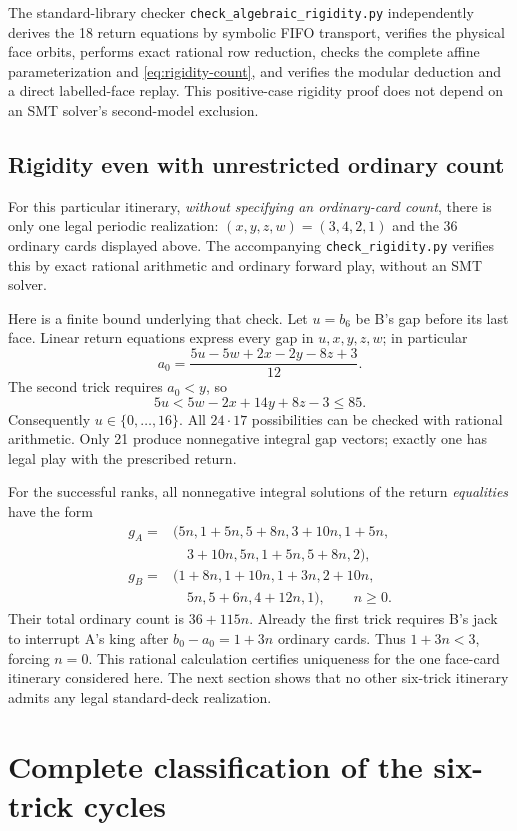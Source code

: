 \documentclass[11pt]{article}
\newcommand{\word}[1]{\texttt{#1}}
\begin{document}
The standard-library checker \word{check\_algebraic\_rigidity.py}
independently derives the 18 return equations by symbolic FIFO transport,
verifies the physical face orbits, performs exact rational row reduction,
checks the complete affine parameterization and \eqref{eq:rigidity-count},
and verifies the modular deduction and a direct labelled-face replay.
This positive-case rigidity proof does not depend on an SMT solver's
second-model exclusion.

\subsection{Rigidity even with unrestricted ordinary count}

For this particular itinerary, \emph{without specifying an ordinary-card
count}, there is only one legal periodic realization: $(x,y,z,w)=(3,4,2,1)$
and the 36 ordinary cards displayed above. The accompanying
\word{check\_rigidity.py} verifies this by exact rational arithmetic and
ordinary forward play, without an SMT solver.

Here is a finite bound underlying that check. Let $u=b_6$ be B's gap before
its last face. Linear return equations express every gap in $u,x,y,z,w$;
in particular
\[
a_0=\frac{5u-5w+2x-2y-8z+3}{12}.
\]
The second trick requires $a_0<y$, so
\[
5u<5w-2x+14y+8z-3\le85.
\]
Consequently $u\in\{0,\ldots,16\}$. All $24\cdot17$ possibilities can
be checked with rational arithmetic. Only 21 produce nonnegative integral
gap vectors; exactly one has legal play with the prescribed return.

For the successful ranks, all nonnegative integral solutions of the return
\emph{equalities} have the form
\[
\begin{aligned}
g_A={}&(5n,1+5n,5+8n,3+10n,1+5n,\\
      &\quad 3+10n,5n,1+5n,5+8n,2),\\
g_B={}&(1+8n,1+10n,1+3n,2+10n,\\
      &\quad 5n,5+6n,4+12n,1),\qquad n\ge0.
\end{aligned}
\]
Their total ordinary count is $36+115n$. Already the first trick requires
B's jack to interrupt A's king after $b_0-a_0=1+3n$ ordinary cards. Thus
$1+3n<3$, forcing $n=0$. This rational calculation certifies uniqueness for the one face-card
itinerary considered here. The next section shows that no other six-trick
itinerary admits any legal standard-deck realization.

\section{Complete classification of the six-trick cycles}\label{sec:six-classification}
\end{document}

